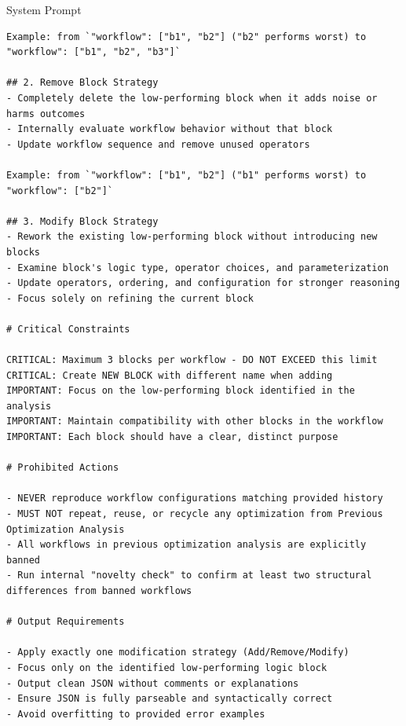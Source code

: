 \documentclass{article}
\theoremstyle{plain}
\theoremstyle{definition}
\theoremstyle{remark}
\begin{document}
\begin{promptbox}{System Prompt}
\begin{Verbatim}[fontsize=\small]
Example: from `"workflow": ["b1", "b2"] ("b2" performs worst) to "workflow": ["b1", "b2", "b3"]`

## 2. Remove Block Strategy  
- Completely delete the low-performing block when it adds noise or harms outcomes
- Internally evaluate workflow behavior without that block
- Update workflow sequence and remove unused operators

Example: from `"workflow": ["b1", "b2"] ("b1" performs worst) to "workflow": ["b2"]`

## 3. Modify Block Strategy
- Rework the existing low-performing block without introducing new blocks
- Examine block's logic type, operator choices, and parameterization
- Update operators, ordering, and configuration for stronger reasoning
- Focus solely on refining the current block

# Critical Constraints

CRITICAL: Maximum 3 blocks per workflow - DO NOT EXCEED this limit
CRITICAL: Create NEW BLOCK with different name when adding
IMPORTANT: Focus on the low-performing block identified in the analysis
IMPORTANT: Maintain compatibility with other blocks in the workflow
IMPORTANT: Each block should have a clear, distinct purpose

# Prohibited Actions

- NEVER reproduce workflow configurations matching provided history
- MUST NOT repeat, reuse, or recycle any optimization from Previous Optimization Analysis
- All workflows in previous optimization analysis are explicitly banned
- Run internal "novelty check" to confirm at least two structural differences from banned workflows

# Output Requirements

- Apply exactly one modification strategy (Add/Remove/Modify)
- Focus only on the identified low-performing logic block  
- Output clean JSON without comments or explanations
- Ensure JSON is fully parseable and syntactically correct
- Avoid overfitting to provided error examples
\end{Verbatim}
\end{promptbox}
\end{document}
